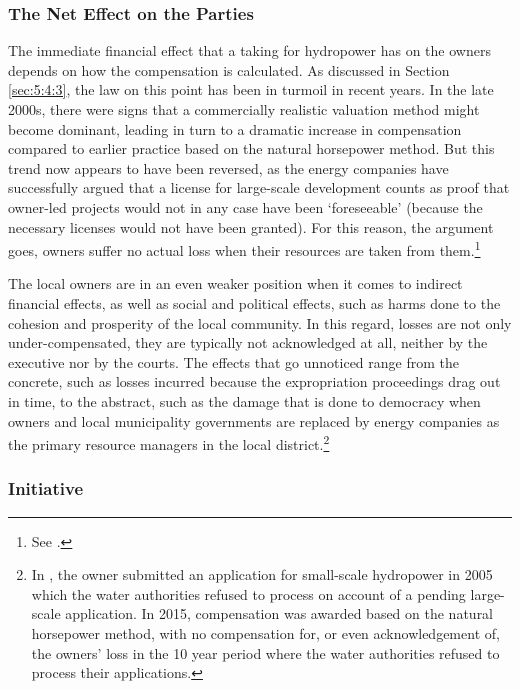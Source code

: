 \subsubsection{The Net Effect on the Parties}\label{sec:5:7:2}

The immediate financial effect that a taking for hydropower has on the owners depends on how the compensation is calculated. As discussed in Section \ref{sec:5:4:3}, the law on this point has been in turmoil in recent years. In the late 2000s, there were signs that a commercially realistic valuation method might become dominant, leading in turn to a dramatic increase in compensation compared to earlier practice based on the natural horsepower method. But this trend now appears to have been reversed, as the energy companies have successfully argued that a license for large-scale development counts as proof that owner-led projects would not in any case have been `foreseeable' (because the necessary licenses would not have been granted). For this reason, the argument goes, owners suffer no actual loss when their resources are taken from them.\footnote{See \cite{otra13}.}

The local owners are in an even weaker position when it comes to indirect financial effects, as well as social and political effects, such as harms done to the cohesion and prosperity of the local community. In this regard, losses are not only under-compensated, they are typically not acknowledged at all, neither by the executive nor by the courts. The effects that go unnoticed range from the concrete, such as losses incurred because the expropriation proceedings drag out in time, to the abstract, such as the damage that is done to democracy when owners and local municipality governments are replaced by energy companies as the primary resource managers in the local district.\footnote{In \cite{smibelg15}, the owner submitted an application for small-scale hydropower in 2005 which the water authorities refused to process on account of a pending large-scale application. In 2015, compensation was awarded based on the natural horsepower method, with no compensation for, or even acknowledgement of, the owners' loss in the 10 year period where the water authorities refused to process their applications.}

\subsubsection{Initiative}\label{sec:5:7:3}

